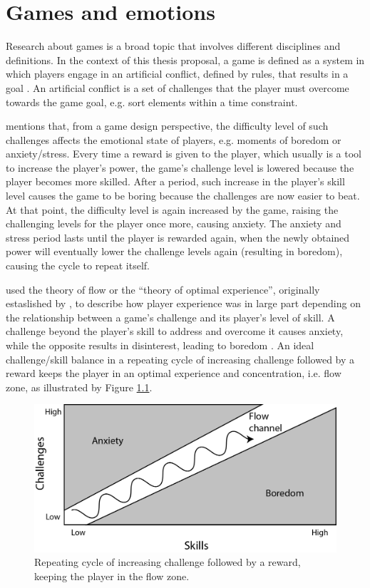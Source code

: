\chapter{Games and emotions}
\label{ch:literature-games}

Research about games is a broad topic that involves different disciplines and definitions. In the context of this thesis proposal, a game is defined as a system in which players engage in an artificial conflict, defined by rules, that results in a goal \parencite{salen2004rules}. An artificial conflict is a set of challenges that the player must overcome towards the game goal, e.g. sort elements within a time constraint.

\textcite{schell2014art} mentions that, from a game design perspective, the difficulty level of such challenges affects the emotional state of players, e.g. moments of boredom or anxiety/stress. Every time a reward is given to the player, which usually is a tool to increase the player's power, the game's challenge level is lowered because the player becomes more skilled. After a period, such increase in the player's skill level causes the game to be boring because the challenges are now easier to beat. At that point, the difficulty level is again increased by the game, raising the challenging levels for the player once more, causing anxiety. The anxiety and stress period lasts until the player is rewarded again, when the newly obtained power will eventually lower the challenge levels again (resulting in boredom), causing the cycle to repeat itself.

\textcite{chen2007flow} used the theory of flow or the ``theory of optimal experience'', originally estaslished by \textcite{csikszentmihalyi1991flow}, to describe how player experience was in large part depending on the relationship between a game's challenge and its player's level of skill. A challenge beyond the player's skill to address and overcome it causes anxiety, while the opposite results in disinterest, leading to boredom \parencite{chen2007flow}. An ideal challenge/skill balance in a repeating cycle of increasing challenge followed by a reward keeps the player in an optimal experience and concentration, i.e. flow zone, as illustrated by Figure \ref{fig:flow-schell}.

\begin{figure}[h!]
    \centering
    \includegraphics[scale=0.8]{Content/figures/flow-schell.png}
    \caption{Repeating cycle of increasing challenge followed by a reward, keeping the player in the flow zone. \parencite{schell2014art}}
    \label{fig:flow-schell}
\end{figure}

